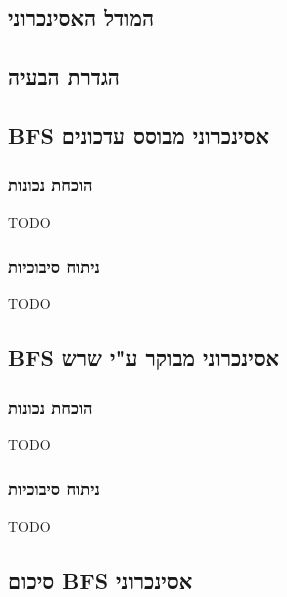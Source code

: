 \subsection{המודל האסינכרוני}

\subsection{הגדרת הבעיה}

\subsection{BFS אסינכרוני מבוסס עדכונים}

\subsubsection{הוכחת נכונות}

\begin{claim}
TODO
\end{claim}

\subsubsection{ניתוח סיבוכיות}

\begin{claim}
TODO
\end{claim}

\subsection{BFS אסינכרוני מבוקר ע"י שרש}


\subsubsection{הוכחת נכונות}

\begin{claim}
TODO
\end{claim}

\subsubsection{ניתוח סיבוכיות}

\begin{claim}
TODO
\end{claim}


\subsection{סיכום BFS אסינכרוני}

